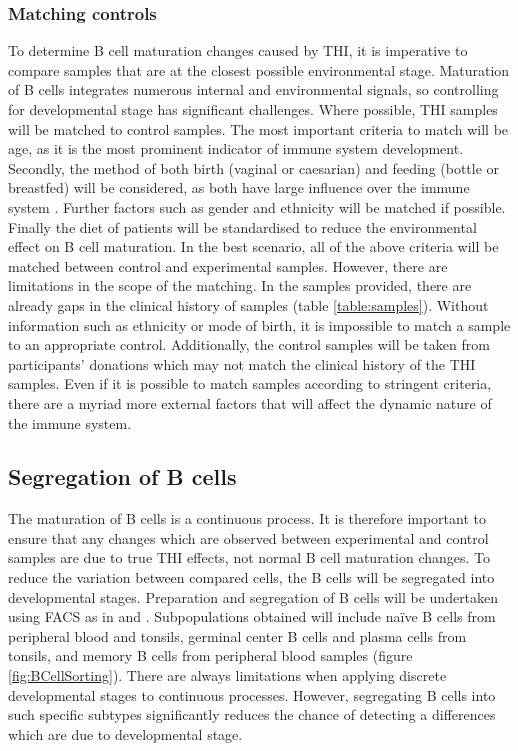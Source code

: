 \documentclass[12pt]{article}
\newcommand{\naive}{na\"{i}ve }
\begin{document}
			\subsubsection{Matching controls} 
			
				To determine B cell maturation changes caused by THI, it is imperative to compare samples that are at the closest possible environmental stage.
				Maturation of B cells integrates numerous internal and environmental signals, so controlling for developmental stage has significant challenges. 
				Where possible, THI samples will be matched to control samples. 
				The most important criteria to match will be age, as it is the most prominent indicator of immune system development. 
				Secondly, the method of both birth (vaginal or caesarian) and feeding (bottle or breastfed) will be considered, as both have large influence over the immune system \citep{Jakobsson14,Cho13,Brandtzaeg03,Rogier14,Gomez14}.
				Further factors such as gender and ethnicity will be matched if possible. 
				Finally the diet of patients will be standardised to reduce the environmental effect on B cell maturation.
				In the best scenario, all of the above criteria will be matched between control and experimental samples. 
				However, there are limitations in the scope of the matching. 
				In the samples provided, there are already gaps in the clinical history of samples (table \ref{table:samples}). 
				Without information such as ethnicity or mode of birth, it is impossible to match a sample to an appropriate control. 
				Additionally, the control samples will be taken from participants' donations which may not match the clinical history of the THI samples.
				Even if it is possible to match samples according to stringent criteria, there are a myriad more external factors that will affect the dynamic nature of the immune system.
				 
				
		
		\subsection{Segregation of B cells}
			
			The maturation of B cells is a continuous process. 
			It is therefore important to ensure that any changes which are observed between experimental and control samples are due to true THI effects, not normal B cell maturation changes.
			To reduce the variation between compared cells, the B cells will be segregated into developmental stages. 
			Preparation and segregation of B cells will be undertaken using FACS as in \citet{Kulis15} and \citet{Oakes16}.
			Subpopulations obtained will include \naive B cells from peripheral blood and tonsils, germinal center B cells and plasma cells from tonsils, and memory B cells from peripheral blood samples (figure \ref{fig:BCellSorting}). 
			There are always limitations when applying discrete developmental stages to continuous processes.
			However, segregating B cells into such specific subtypes significantly reduces the chance of detecting a differences which are due to developmental stage. 
			
\end{document}
